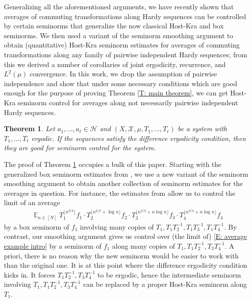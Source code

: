 \documentclass[11pt]{amsart}
\newtheorem{theorem}[lemma]{Theorem}
\theoremstyle{definition}
\DeclareMathOperator*{\E}{\mathbb{E}}
\newcommand{\CH}{{\mathcal H}}
\newcommand{\CX}{{\mathcal X}}
\newcommand{\inv}{^{-1}}
\newcommand{\1}{{\mathbf{1}}}
\newcommand{\sfloor}[1]{{\lfloor #1 \rfloor}}
\begin{document}
Generalizing all the aforementioned arguments, we have recently shown \cite{DKKST24} that averages of commuting transformations along Hardy sequences can be controlled by certain seminorms that generalize the now classical Host-Kra and box seminorms. We then used a variant of the seminorm smoothing argument to obtain (quantitative) Host-Kra seminorm estimates for averages of commuting transformations along any family of pairwise independent Hardy sequences; from this we derived a number of corollaries of joint ergodicity, recurrence, and $L^2(\mu)$ convergence. In this work, we drop the assumption of pairwise independence and show that under some necessary conditions which are good enough for the purpose of proving Theorem \ref{T: main theorem}, we can get Host-Kra seminorm control for averages along not necessarily pairwise independent Hardy sequences.
\begin{theorem}\label{T: seminorm control}
    Let $a_1, \ldots, a_\ell\in\CH$ and $(X, \CX, \mu, T_1, \ldots, T_\ell)$ be a system with $T_1, \ldots, T_\ell$ ergodic. If the sequences satisfy the difference ergodicity condition, then they are good for seminorm control for the system. 
\end{theorem}
The proof of Theorem \ref{T: seminorm control} occupies a bulk of this paper. Starting with the generalized box seminorm estimates from \cite{DKKST24}, we use a new variant of the seminorm smoothing argument to obtain another collection of seminorm estimates for the averages in question. For instance, the estimates from \cite{DKKST24} allow us to control the limit of an average 
\begin{align}\label{E: average example intro}
    \E_{n\in[N]} T_1^{\sfloor{n^{3/2}}}f_1\cdot T_2^{\sfloor{n^{3/2}+\log n}}f_2\cdot T_3^{\sfloor{n^{3/2}+n\log n}}f_3\cdot T_4^{\sfloor{n^{3/2}+n\log n}}f_4
\end{align}
by a box seminorm of $f_1$ involving many copies of $T_1, T_1T_2\inv, T_1T_3\inv, T_1T_4\inv$. By contrast, our smoothing argument gives us control over (the limit of) \eqref{E: average example intro} by a seminorm of $f_1$ along many copies of $T_1, T_1T_2\inv, T_3T_4\inv$.
A priori, there is no reason why the new seminorm 
would be easier to work with than the original one. It is at this point where the difference ergodicity condition kicks in. It forces $T_1T_2\inv, T_3T_4\inv$ to be ergodic, hence the intermediate seminorm involving $T_1, T_1T_2\inv, T_3T_4\inv$ can be replaced by a proper Host-Kra seminorm along $T_1$. 
\end{document}
